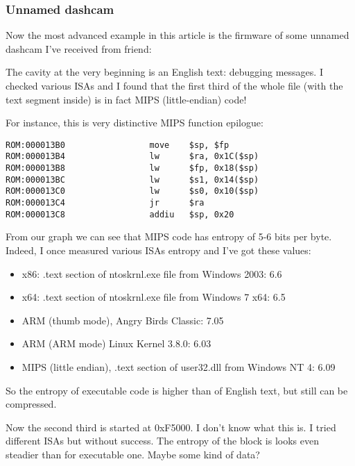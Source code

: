 \subsubsection{Unnamed dashcam}

Now the most advanced example in this article is the firmware of some unnamed dashcam I've received from friend:

\begin{figure}[H]
\centering
{}
\end{figure}

The cavity at the very beginning is an English text: debugging messages.
I checked various ISAs and I found that 
the first third of the whole file (with the text segment inside) is in fact MIPS (little-endian) code!

For instance, this is very distinctive MIPS function epilogue:

\begin{lstlisting}[style=customasmMIPS]
ROM:000013B0                 move    $sp, $fp
ROM:000013B4                 lw      $ra, 0x1C($sp)
ROM:000013B8                 lw      $fp, 0x18($sp)
ROM:000013BC                 lw      $s1, 0x14($sp)
ROM:000013C0                 lw      $s0, 0x10($sp)
ROM:000013C4                 jr      $ra
ROM:000013C8                 addiu   $sp, 0x20
\end{lstlisting}

From our graph we can see that MIPS code has entropy of 5-6 bits per byte.
Indeed, I once measured various ISAs entropy and I've got these values:

\begin{itemize}
\item x86: .text section of ntoskrnl.exe file from Windows 2003: 6.6
\item x64: .text section of ntoskrnl.exe file from Windows 7 x64: 6.5
\item ARM (thumb mode), Angry Birds Classic: 7.05
\item ARM (ARM mode) Linux Kernel 3.8.0: 6.03
\item MIPS (little endian), .text section of user32.dll from Windows NT 4: 6.09
\end{itemize}

So the entropy of executable code is higher than of English text, but still can be compressed.

Now the second third is started at 0xF5000. I don't know what this is. I tried different ISAs but without success.
The entropy of the block is looks even steadier than for executable one.
Maybe some kind of data?

